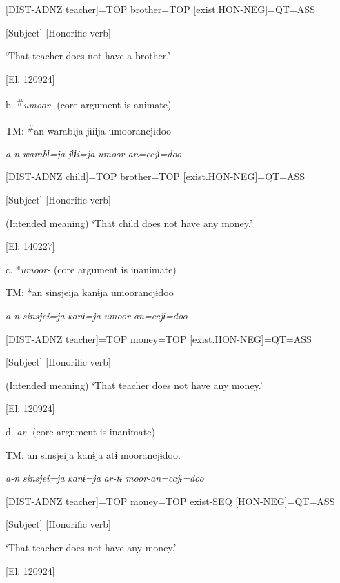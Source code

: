       [DIST-ADNZ  teacher]=TOP  brother=TOP  [exist.HON-NEG]=QT=ASS

      [Subject]      [Honorific verb]

      ‘That teacher does not have a brother.’

      [El: 120924]

  b.  \textsuperscript{\#}\textit{umoor-} (core argument is animate)

    TM:  \textsuperscript{\#}an  warabɨja  jɨɨija  umoorancjɨdoo

      \textit{a-n}  \textit{warabɨ=ja}  \textit{jɨɨi=ja}  \textit{umoor{}-an=ccjɨ=doo}

      [DIST-ADNZ  child]=TOP  brother=TOP  [exist.HON-NEG]=QT=ASS

      [Subject]      [Honorific verb]

      (Intended meaning) ‘That child does not have any money.’

      [El: 140227]

  c.  *\textit{umoor-} (core argument is inanimate)

    TM:  *an  sinsjeija  kanɨja  umoorancjɨdoo

      \textit{a-n}  \textit{sinsjei=ja}  \textit{kanɨ=ja}  \textit{umoor{}-an=ccjɨ=doo}

      [DIST-ADNZ  teacher]=TOP  money=TOP  [exist.HON-NEG]=QT=ASS

      [Subject]      [Honorific verb]

      (Intended meaning) ‘That teacher does not have any money.’

      [El: 120924]

  d.  \textit{ar-} (core argument is inanimate)

    TM:  an  sinsjeija  kanɨja  atɨ  moorancjɨdoo.

      \textit{a-n}  \textit{sinsjei=ja}  \textit{kanɨ=ja}  \textit{ar{}-tɨ  moor-an=ccjɨ=doo}

      [DIST-ADNZ  teacher]=TOP  money=TOP  exist-SEQ  [HON-NEG]=QT=ASS

      [Subject]        [Honorific verb]

      ‘That teacher does not have any money.’

      [El: 120924]

